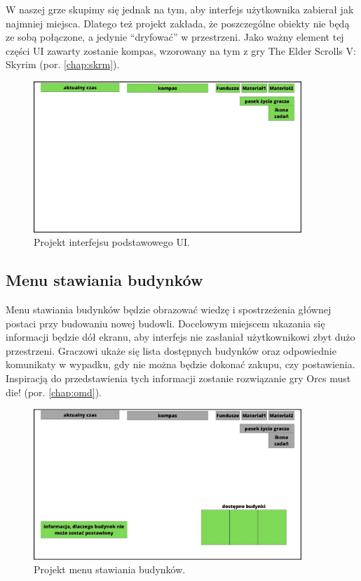 W naszej grze skupimy się jednak na tym, aby interfejs użytkownika zabierał jak najmniej miejsca. Dlatego też projekt zakłada, że poszczególne obiekty nie będą ze sobą połączone, a jedynie “dryfować” w przestrzeni.
Jako ważny element tej części UI zawarty zostanie kompas, wzorowany na tym z gry The Elder Scrolls V: Skyrim (por. \ref{chap:skrm}).
\begin{figure}[htbp]
    \centering
    \includegraphics[width=0.9\textwidth]{images/ui/ui_proj_ogolne.jpg}
    \caption{Projekt interfejsu podstawowego UI.
    }\label{fig:ui_main}
\end{figure}
 
\subsection{Menu stawiania budynków}
Menu stawiania budynków będzie obrazować wiedzę i spostrzeżenia głównej postaci przy budowaniu nowej budowli. Docelowym miejscem ukazania się informacji będzie 
dół ekranu, aby interfejs nie zasłaniał użytkownikowi zbyt dużo przestrzeni. Graczowi ukaże się lista dostępnych budynków oraz odpowiednie komunikaty w wypadku, gdy 
nie można będzie dokonać zakupu, czy postawienia. Inspiracją do przedstawienia tych informacji zostanie rozwiązanie gry Orcs must die! (por. \ref{chap:omd}).
\begin{figure}[htbp]
    \centering
    \includegraphics[width=0.9\textwidth]{images/ui/ui_proj_budowanie.jpg}
    \caption{Projekt menu stawiania budynków.
    }\label{fig:ui_bud}
\end{figure}

